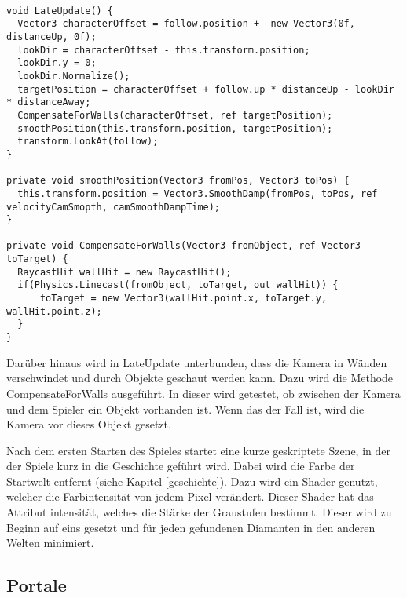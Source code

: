 \begin{scriptsize}
\lstset{
	float,
	caption=Methode LateUpdate aus ThirdPersonCamera.cs, 
	language=[Sharp]C, 
	frame=single,  
	showstringspaces=false, 
	showspaces=false, 
	numbers=left, 
	captionpos=b, 
	belowcaptionskip=4pt,
	basicstyle=\ttfamily
} 
\begin{lstlisting}[label=lst:lateupdate]

void LateUpdate() {
  Vector3 characterOffset = follow.position +  new Vector3(0f, distanceUp, 0f);
  lookDir = characterOffset - this.transform.position;
  lookDir.y = 0;
  lookDir.Normalize();
  targetPosition = characterOffset + follow.up * distanceUp - lookDir * distanceAway;
  CompensateForWalls(characterOffset, ref targetPosition);
  smoothPosition(this.transform.position, targetPosition);
  transform.LookAt(follow);
}

private void smoothPosition(Vector3 fromPos, Vector3 toPos) {
  this.transform.position = Vector3.SmoothDamp(fromPos, toPos, ref velocityCamSmopth, camSmoothDampTime);
}

private void CompensateForWalls(Vector3 fromObject, ref Vector3 toTarget) {
  RaycastHit wallHit = new RaycastHit();
  if(Physics.Linecast(fromObject, toTarget, out wallHit)) {
      toTarget = new Vector3(wallHit.point.x, toTarget.y, wallHit.point.z);
  }
}

\end{lstlisting}
\end{scriptsize}

Darüber hinaus wird in LateUpdate unterbunden, dass die Kamera in Wänden verschwindet und durch Objekte geschaut werden kann. Dazu wird die Methode CompensateForWalls ausgeführt. In dieser wird getestet, ob zwischen der Kamera und dem Spieler ein Objekt vorhanden ist. Wenn das der Fall ist, wird die Kamera vor dieses Objekt gesetzt.

Nach dem ersten Starten des Spieles startet eine kurze geskriptete Szene, in der der Spiele kurz in die Geschichte geführt wird. Dabei wird die Farbe der Startwelt entfernt  (siehe Kapitel \ref{geschichte}). Dazu wird ein Shader genutzt, welcher die Farbintensität von jedem Pixel verändert. Dieser Shader hat das Attribut intensität, welches die Stärke der Graustufen bestimmt. Dieser wird zu Beginn auf eins gesetzt und für jeden gefundenen Diamanten in den anderen Welten minimiert.
    
\subsection{Portale}



